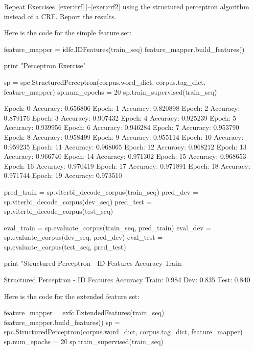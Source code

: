 \begin{exercise}
Repeat Exercises~\ref{exer:crf1}--\ref{exer:crf2} using the structured perceptron algorithm 
instead of a CRF. Report the results. 

Here is the code for the simple feature set:


\begin{python}
feature_mapper = idfc.IDFeatures(train_seq)
feature_mapper.build_features()

print "Perceptron Exercise"

sp = spc.StructuredPerceptron(corpus.word_dict, corpus.tag_dict, feature_mapper)
sp.num_epochs = 20
sp.train_supervised(train_seq)

Epoch: 0 Accuracy: 0.656806
Epoch: 1 Accuracy: 0.820898
Epoch: 2 Accuracy: 0.879176
Epoch: 3 Accuracy: 0.907432
Epoch: 4 Accuracy: 0.925239
Epoch: 5 Accuracy: 0.939956
Epoch: 6 Accuracy: 0.946284
Epoch: 7 Accuracy: 0.953790
Epoch: 8 Accuracy: 0.958499
Epoch: 9 Accuracy: 0.955114
Epoch: 10 Accuracy: 0.959235
Epoch: 11 Accuracy: 0.968065
Epoch: 12 Accuracy: 0.968212
Epoch: 13 Accuracy: 0.966740
Epoch: 14 Accuracy: 0.971302
Epoch: 15 Accuracy: 0.968653
Epoch: 16 Accuracy: 0.970419
Epoch: 17 Accuracy: 0.971891
Epoch: 18 Accuracy: 0.971744
Epoch: 19 Accuracy: 0.973510

pred_train = sp.viterbi_decode_corpus(train_seq)
pred_dev = sp.viterbi_decode_corpus(dev_seq)
pred_test = sp.viterbi_decode_corpus(test_seq)



eval_train = sp.evaluate_corpus(train_seq, pred_train)
eval_dev = sp.evaluate_corpus(dev_seq, pred_dev)
eval_test = sp.evaluate_corpus(test_seq, pred_test)

print "Structured Perceptron - ID Features Accuracy Train: %
\end{python}


\begin{python}
Structured Perceptron - ID Features Accuracy Train: 0.984 Dev: 0.835 Test: 0.840
\end{python}

Here is the code for the extended feature set:

\begin{python}
feature_mapper = exfc.ExtendedFeatures(train_seq)
feature_mapper.build_features()
sp = spc.StructuredPerceptron(corpus.word_dict, corpus.tag_dict, feature_mapper)
sp.num_epochs = 20
sp.train_supervised(train_seq)


\end{python}
\end{exercise}
